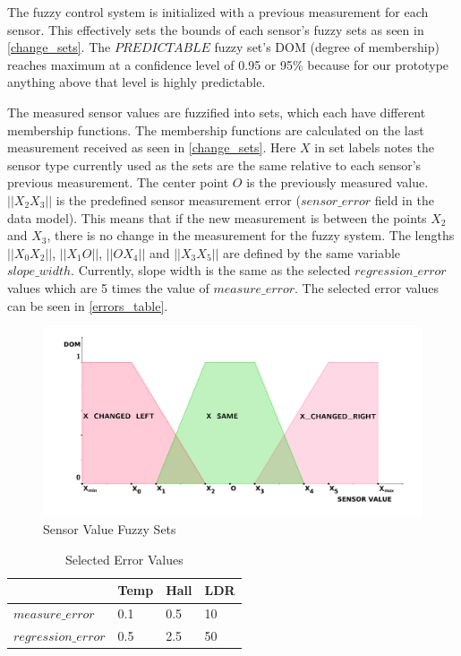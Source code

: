 The fuzzy control system is initialized with a previous measurement for each sensor. This effectively sets the bounds of each sensor's fuzzy sets as seen in \autoref{change_sets}. The $PREDICTABLE$ fuzzy set's DOM (degree of membership) reaches maximum at a confidence level of 0.95 or 95\% because for our prototype anything above that level is highly predictable. 

The measured sensor values are fuzzified into sets, which each have different membership functions. The membership functions are calculated on the last measurement received as seen in \autoref{change_sets}. Here $X$ in set labels notes the sensor type currently used as the sets are the same relative to each sensor's previous measurement. The center point $O$ is the previously measured value. $||X_2X_3||$ is the predefined sensor measurement error  ($sensor\_error$ field in the data model). This means that if the new measurement is between the points $X_2$ and $X_3$, there is no change in the measurement for the fuzzy system. The lengths $||X_0X_2||$, $||X_1O||$, $||OX_4||$ and $||X_3X_5||$ are defined by the same variable $slope\_width$. Currently, slope width is the same as the selected $regression\_error$ values which are 5 times the value of $measure\_error$. The selected error values can be seen in \autoref{errors_table}. 

\begin{figure}[h!]
\centering
\includegraphics[scale=0.55]{4/figures/change_sets.pdf}
\caption{Sensor Value Fuzzy Sets}
\label{change_sets}
\end{figure}

\begin{table}[h]
\centering
  \begin{tabular}{| l | l | l | l |}
    \hline
     & Temp & Hall & LDR \\ \hline
    $measure\_error$ & 0.1 & 0.5 & 10 \\ \hline
    $regression\_error$ & 0.5 & 2.5 & 50 \\
    \hline
  \end{tabular}
\caption{Selected Error Values}
\label{errors_table}
\end{table}


